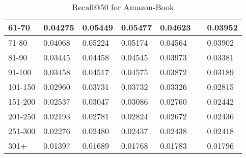 \begin{table*}[]
\begin{tabular}{|l|l|l|l|l|l|l|}
        61-70     & 0.04275                        & 0.05449                        & 0.05477                        & 0.04623                        &                                & 0.03952                               \\ \hline
        71-80     & 0.04068                        & 0.05224                        & 0.05174                        & 0.04564                        &                                & 0.03902                               \\ \hline
        81-90     & 0.03445                        & 0.04458                        & 0.04545                        & 0.03973                        &                                & 0.03381                               \\ \hline
        91-100    & 0.03458                        & 0.04517                        & 0.04575                        & 0.03872                        &                                & 0.03189                               \\ \hline
        101-150   & 0.02960                        & 0.03731                        & 0.03732                        & 0.03326                        &                                & 0.02815                               \\ \hline
        151-200   & 0.02537                        & 0.03047                        & 0.03086                        & 0.02760                        &                                & 0.02442                               \\ \hline
        201-250   & 0.02193                        & 0.02781                        & 0.02824                        & 0.02672                        &                                & 0.02436                               \\ \hline
        251-300   & 0.02276                        & 0.02480                        & 0.02437                        & 0.02438                        &                                & 0.02418                               \\ \hline
        301+      & 0.01397                        & 0.01689                        & 0.01768                        & 0.01783                        &                                & 0.01796                               \\ \hline
    \end{tabular}
    \caption{Recall@50 for Amazon-Book}
\end{table*}
